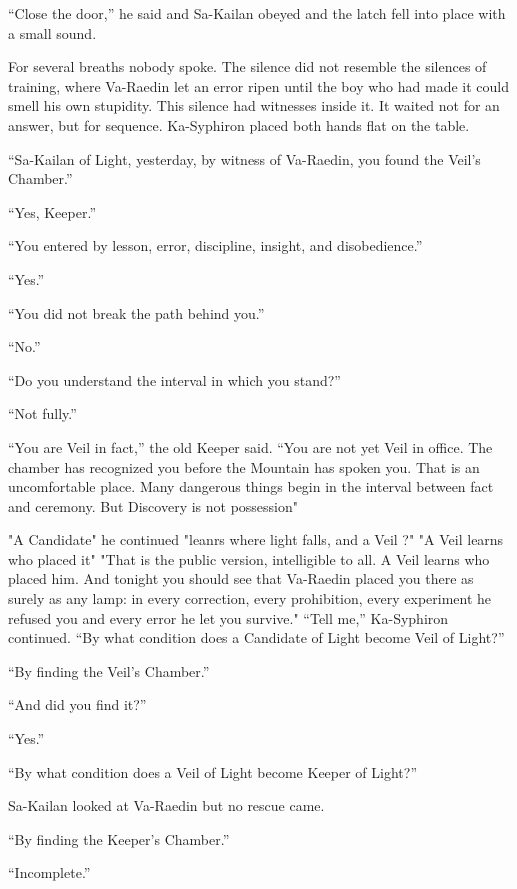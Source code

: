 “Close the door,” he said and Sa-Kailan obeyed and the latch fell into place with a small sound.\par

For several breaths nobody spoke.
The silence did not resemble the silences of training, where Va-Raedin let an error ripen until the boy who had made it could smell his own stupidity. 
This silence had witnesses inside it. 
It waited not for an answer, but for sequence.
Ka-Syphiron placed both hands flat on the table.\par

“Sa-Kailan of Light, yesterday, by witness of Va-Raedin, you found the Veil’s Chamber.”\par
“Yes, Keeper.”\par
“You entered by lesson, error, discipline, insight, and disobedience.”\par
“Yes.”\par
“You did not break the path behind you.”\par
“No.”\par
“Do you understand the interval in which you stand?”\par
“Not fully.”\par
“You are Veil in fact,” the old Keeper said. “You are not yet Veil in office. The chamber has recognized you before the Mountain has spoken you. 
That is an uncomfortable place. Many dangerous things begin in the interval between fact and ceremony. But Discovery is not possession" \par
"A Candidate" he continued "leanrs where light falls, and a Veil ?"
"A Veil learns who placed it"
"That is the public version, intelligible to all. A Veil learns who placed him. 
And tonight you should see that Va-Raedin placed you there as surely as any lamp: in every correction, every prohibition, every experiment he refused you and every error he let you survive."
“Tell me,” Ka-Syphiron continued. “By what condition does a Candidate of Light become Veil of Light?”\par
“By finding the Veil’s Chamber.”\par
“And did you find it?”\par
“Yes.”\par
“By what condition does a Veil of Light become Keeper of Light?”\par
Sa-Kailan looked at Va-Raedin but no rescue came.\par
“By finding the Keeper’s Chamber.”\par
“Incomplete.”\par
